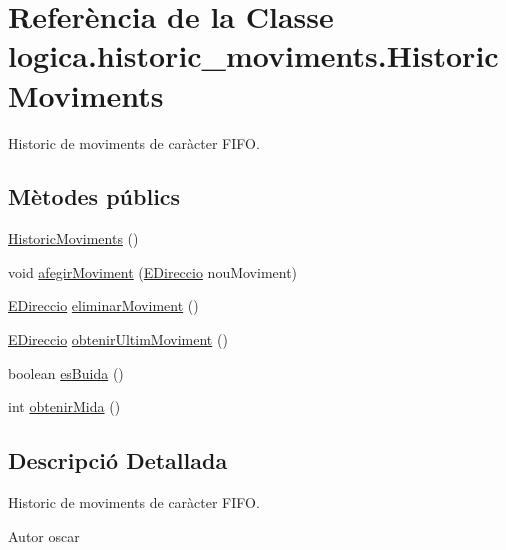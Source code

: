 \hypertarget{classlogica_1_1historic__moviments_1_1_historic_moviments}{\section{Referència de la Classe logica.\+historic\+\_\+moviments.\+Historic\+Moviments}
\label{classlogica_1_1historic__moviments_1_1_historic_moviments}
}


Historic de moviments de caràcter F\+I\+F\+O.  


\subsection*{Mètodes públics}
\begin{DoxyCompactItemize}
\item 
\hyperlink{classlogica_1_1historic__moviments_1_1_historic_moviments_a495dab908c92d96be0111a337aa64616}{Historic\+Moviments} ()
\item 
void \hyperlink{classlogica_1_1historic__moviments_1_1_historic_moviments_add8ce785d3feabe0489005024fa34c31}{afegir\+Moviment} (\hyperlink{enumlogica_1_1enumeracions_1_1_e_direccio}{E\+Direccio} nou\+Moviment)
\item 
\hyperlink{enumlogica_1_1enumeracions_1_1_e_direccio}{E\+Direccio} \hyperlink{classlogica_1_1historic__moviments_1_1_historic_moviments_af8ab1a5f7f30d6bf02567247f551a56d}{eliminar\+Moviment} ()
\item 
\hyperlink{enumlogica_1_1enumeracions_1_1_e_direccio}{E\+Direccio} \hyperlink{classlogica_1_1historic__moviments_1_1_historic_moviments_a38f0ad91020d373f59f3ca715d8348cd}{obtenir\+Ultim\+Moviment} ()
\item 
boolean \hyperlink{classlogica_1_1historic__moviments_1_1_historic_moviments_a6a28bbb1fb8d5d017b98ff6fae9cb684}{es\+Buida} ()
\item 
int \hyperlink{classlogica_1_1historic__moviments_1_1_historic_moviments_ae8749aa4dc16dc362b784796325dbc92}{obtenir\+Mida} ()
\end{DoxyCompactItemize}


\subsection{Descripció Detallada}
Historic de moviments de caràcter F\+I\+F\+O. 

\begin{DoxyAuthor}{Autor}
oscar 
\end{DoxyAuthor}


